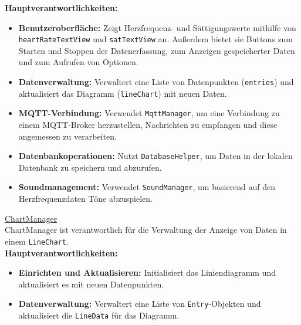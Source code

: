 \documentclass[conference,a4paper,flushend]{cs-techrep}
\begin{document}
\textbf{Hauptverantwortlichkeiten:}
\begin{itemize}
    \vspace{0.5em}
    \item \textbf{Benutzeroberfläche:} Zeigt Herzfrequenz- und Sättigungswerte mithilfe von \texttt{heartRateTextView} und \texttt{satTextView} an. Außerdem bietet sie Buttons zum Starten und Stoppen der Datenerfassung, zum Anzeigen gespeicherter Daten und zum Aufrufen von Optionen.
    \vspace{0.5em}
    \item \textbf{Datenverwaltung:} Verwaltert eine Liste von Datenpunkten (\texttt{entries}) und aktualisiert das Diagramm (\texttt{lineChart}) mit neuen Daten.
    \vspace{0.5em}
    \item \textbf{MQTT-Verbindung:} Verwendet \texttt{MqttManager}, um eine Verbindung zu einem MQTT-Broker herzustellen, Nachrichten zu empfangen und diese angemessen zu verarbeiten.
    \vspace{0.5em}
    \item \textbf{Datenbankoperationen:} Nutzt \texttt{DatabaseHelper}, um Daten in der lokalen Datenbank zu speichern und abzurufen.
    \vspace{0.5em}
    \item \textbf{Soundmanagement:} Verwendet \texttt{SoundManager}, um basierend auf den Herzfrequenzdaten Töne abzuspielen.
    \vspace{0.5em}
\end{itemize}

\underline{ChartManager}\vspace{0.5em}\\
ChartManager ist verantwortlich für die Verwaltung der Anzeige von Daten in einem \texttt{LineChart}.\\

\textbf{Hauptverantwortlichkeiten:}
\begin{itemize}
    \vspace{0.5em}
    \item \textbf{Einrichten und Aktualisieren:} Initialisiert das Liniendiagramm und aktualisiert es mit neuen Datenpunkten.
    \vspace{0.5em}
    \item \textbf{Datenverwaltung:} Verwaltert eine Liste von \texttt{Entry}-Objekten und aktualisiert die \texttt{LineData} für das Diagramm.
    \vspace{0.5em}
\end{itemize}
\end{document}
